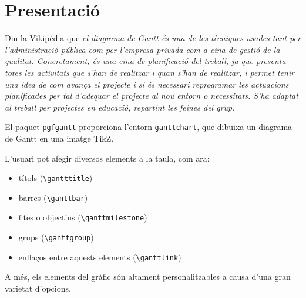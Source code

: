 \documentclass[a4paper,%
	      10pt,%
              parskip=half,%
]{scrartcl}
\title{\Titol}
\author{Joan Queralt Gil\\cata\LaTeX{}}
\date{\today}
\begin{document}
\maketitle

\section{Presentació}
Diu la \href{http://ca.wikipedia.org/wiki/Diagrama_de_Gantt}{Vikipèdia} que \textit{el diagrama de Gantt és una de les tècniques usades tant per l'administració pública com per l'empresa privada com a eina de gestió de la qualitat. Concretament, és una eina de planificació del treball, ja que presenta totes les activitats que s'han de realitzar i quan s'han de realitzar, i permet tenir una idea de com avança el projecte i si és necessari reprogramar les actuacions planificades per tal d'adequar el projecte al nou entorn o necessitats. S'ha adaptat al treball per projectes en educació, repartint les feines del grup}.

El paquet \verb+pgfgantt+ proporciona l'entorn \verb+ganttchart+, que
dibuixa un diagrama de Gantt en una imatge TikZ. 

L'usuari pot afegir diversos elements a la taula, com ara:
\begin{itemize}
 \item títols (\verb+\gantttitle+)
 \item barres (\verb+\ganttbar+)
 \item fites o objectius (\verb+\ganttmilestone+)
 \item grups (\verb+\ganttgroup+)
 \item enllaços entre aquests elements (\verb+\ganttlink+)
\end{itemize}

A més, els elements del gràfic són altament personalitzables a causa d'una
gran varietat d'opcions.
\end{document}
